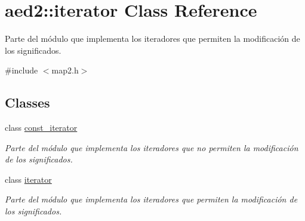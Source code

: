 \hypertarget{classaed2_1_1iterator}{}\section{aed2\+:\+:iterator Class Reference}
\label{classaed2_1_1iterator}


Parte del módulo que implementa los iteradores que permiten la modificación de los significados.  




{\ttfamily \#include $<$map2.\+h$>$}

\subsection*{Classes}
\begin{DoxyCompactItemize}
\item 
class \hyperlink{classaed2_1_1iterator_1_1const__iterator}{const\+\_\+iterator}
\begin{DoxyCompactList}\small\item\em Parte del módulo que implementa los iteradores que no permiten la modificación de los significados. \end{DoxyCompactList}\item 
class \hyperlink{classaed2_1_1iterator_1_1iterator}{iterator}
\begin{DoxyCompactList}\small\item\em Parte del módulo que implementa los iteradores que permiten la modificación de los significados. \end{DoxyCompactList}\end{DoxyCompactItemize}

